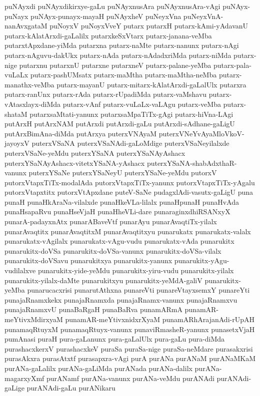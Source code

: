 {puNAyxdi
puNAyxdikirxye-gaLu
puNAyxnusAra
puNAyxnusAra-vAgi
puNAyx-puNayx
puNAyx-punayx-mayaH
puNAyxheV
puNeyxVna
puNeyxVnA-nanAvxgataM
puNoyxV
puNoyxVveY
putarx
putarxH
putarx-kAmi-yAdavanU
putarx-kAlatArxdi-gaLalilx
putarxkeSxVtarx
putarx-janana-veMba
putarxtApxdane-yiMda
putarxna
putarx-naMte
putarx-nanunx
putarx-nAgi
putarx-nAguvu-dakUkx
putarx-nAda
putarx-nAdadxriMda
putarx-niMda
putarx-nige
putarxnu
putarxnU
putarxne
putarxneV
putarx-palane-yeMba
putarx-pala-vuLaLx
putarx-pashUMsatx
putarx-maMtha
putarx-maMtha-neMba
putarx-manathx-veMba
putarx-mayanU
putarx-mitarx-kAlatArxdi-gaLalUlx
putarxra
putarx-ranUnx
putarx-rAda
putarx-rUpadiMda
putarx-vaMshavu
putarx-vAtasxlayx-diMda
putarx-vAnf
putarx-vuLaLx-vaLAgu
putarx-veMba
putarx-shataM
putarxsaMtati-yanunx
putarxsaMpaTiTx-gAgi
putarx-hiVna-LAgi
putArxH
putArxNAM
putArxdi
putArxdi-gaLu
putArxdi-sAdhane-gaLigU
putArxBimAna-diMda
putArxya
puterxVNAyaM
puterxVNeYvAyaMloVkoV-jayoyxV
puterxVSaNA
puterxVSaNAdi-gaLoMdige
puterxVSaNeyilalxde
puterxVSaNe-yeMdu
puterxYSaNA
puterxYSaNAyAshacx
puterxYSaNAyAshacx-vitetxYSaNA-yAshacx
puterxYSaNA-shabAdxthaR-vanunx
puterxYSaNe
puterxYSaNeyU
puterxYSaNe-yeMdu
putorxV
putorxVtapxTiTx-modalAda
putorxVtapxTiTx-yanunx
putorxVtapxTiTx-yAgalu
putorxVtapxtitx
putorxVtApxdane
puteV-SaNe
pudagxlAdi-vasutx-gaLigU
puna
punaH
punaHkAraNa-vilalxde
punaHkeVLa-lilalx
punaHpunaH
punaHvAda
punaHsapaRvu
punaHseVjaH
punaHheVLi-dare
punaraginxdhiRSANxyX
punarA-padayxnAtx
punarABaveVtf
punarAyu
punarAvaqtiTx-yilalx
punarAvaqtitx
punarAvaqtitxM
punarAvaqtitxyu
punarukatx
punarukatx-valalx
punarukatx-vAgilalx
punarukatx-vAgu-vudu
punarukatx-vAda
punarukitx
punarukitx-doVSa
punarukitx-doVSa-vanunx
punarukitx-doVSa-vilalx
punarukitx-doVSavu
punarukitxya
punarukitx-yanunx
punarukitx-yAgu-vudilalxve
punarukitx-yide-yeMdu
punarukitx-yiru-vudu
punarukitx-yilalx
punarukitx-yilalx-daMte
punarukitxyu
punarukitx-yeMdA-galiV
punarukitx-yeMba
punarucacxrisi
punarutAthxna
punareVti
punareVtayxsemxY
punareYti
punajaRnamxkekx
punajaRnamxda
punajaRnamx-vanunx
punajaRnamxvu
punajaRnamxvU
punaBaRgaH
punaBaRva
punamARmA
punamAR-meYtivxMdirxyaM
punamAR-meYtivxnidxrXyaM
punamARhArajanAdi-rUpAH
punamaqRtuyxM
punamaqRtuyx-vanunx
punaviRmasheR-yanunx
punasetxVjaH
pumAnasi
puraH
pura-gaLanunx
pura-gaLalUlx
pura-gaLu
pura-diMda
purashacxkerxV
purashacxkeV
puraSa
puraSa-nige
puraSa-neMdare
purasakxrisi
purasAkxra
purasAtxtf
purasapxra-vAgi
purA
purANa
purANaM
purANaMKaM
purANa-gaLalilx
purANa-gaLiMda
purANada
purANa-dalilx
purANa-magarxyXmf
purANamf
purANa-vanunx
purANa-veMdu
purANAdi
purANAdi-gaLige
purANAdi-gaLu
purANikaru
}
